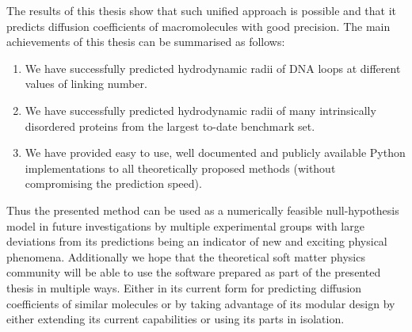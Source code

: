 \documentclass{doctoral}
\begin{document}
The results of this thesis show that such unified approach is possible and that it predicts diffusion coefficients of macromolecules with good precision.
The main achievements of this thesis can be summarised as follows:
\begin{enumerate}
    \item We have successfully predicted hydrodynamic radii of DNA loops at different values of linking number.
    \item We have successfully predicted hydrodynamic radii of many intrinsically disordered proteins from the largest to-date benchmark set.
    \item We have provided easy to use, well documented and publicly available Python implementations to all theoretically proposed methods (without compromising the prediction speed).
\end{enumerate}

Thus the presented method can be used as a numerically feasible null-hypothesis model in future investigations by multiple experimental groups with large deviations from its predictions being an indicator of new and exciting physical phenomena.
Additionally we hope that the theoretical soft matter physics community will be able to use the software prepared as part of the presented thesis in multiple ways.
Either in its current form for predicting diffusion coefficients of similar molecules or by taking advantage of its modular design by either extending its current capabilities or using its parts in isolation.

\printbibliography[heading=bibchapter]
\end{document}
